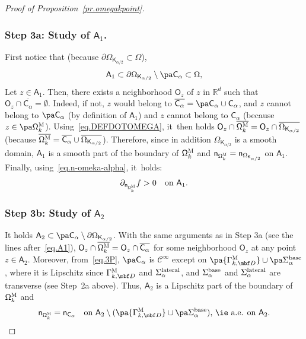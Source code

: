 \begin{proof}[Proof of Proposition~\ref{pr.omegakpoint}]
\subsubsection*{Step 3a: Study of $\mathsf A_1$. }
First notice that (because $\partial \Omega_{\mathsf K_{\alpha/2}}\subset \Omega$),
\begin{equation}\label{eq.A1}
\mathsf A_1\subset \partial \Omega_{\mathsf K_{\alpha/2}}\setminus \pa \mathsf C_\alpha \subset \Omega,
\end{equation}
Let $z\in\mathsf A_1$. Then, there exists a neighborhood $\mathsf O_z$ of $z$ in $\mathbb R^d$ such that $\mathsf O_z\cap \overline{\mathsf C_\alpha}=\emptyset$. Indeed, if not, $z$ would belong to $\overline{\mathsf C_\alpha}=\pa \mathsf C_{\alpha}\cup \mathsf C_{\alpha}$, and $z$ cannot belong to $\pa \mathsf C_{\alpha}$ (by definition of $\mathsf A_1$) and $z$ cannot belong to $ \mathsf C_{\alpha}$ (because $z\in \pa \mathsf \Omega_k^{\textsc{M}}$). Using~\eqref{eq.DEFDOTOMEGA}, it~then holds $\mathsf O_z\cap \overline{\mathsf \Omega_k^{\textsc{M}}}= \mathsf O_z \cap \overline{\Omega_{\mathsf K_{\alpha/2}}}$ (because $\overline{\mathsf \Omega_k^{\textsc{M}}}=\overline{\mathsf C_\alpha}\cup \overline{\Omega_{\mathsf K_{\alpha/2}}}$).
Therefore, since in addition $\Omega_{\mathsf K_{\alpha/2}}$ is a smooth domain, $\mathsf A_1$ is a smooth part of the boundary of $ \mathsf \Omega_k^{\textsc{M}}$ and $\mathsf n_{ \mathsf \Omega_k^{\textsc{M}}}=\mathsf n_{ \Omega_{\mathsf K_{\alpha/2}}}$ on $\mathsf A_1$.
Finally, using~\eqref{eq.n-omeka-alpha}, it~holds:
\begin{equation}\label{eq.panf1}
\partial_{ \mathsf n_{ \mathsf \Omega_k^{\textsc{M}}}} f>0 \quad\text{on }\mathsf A_1.
\end{equation}
\subsubsection*{Step 3b: Study of $\mathsf A_2$}
It holds $\mathsf A_2 \subset \pa \mathsf C_\alpha\setminus\partial \Omega_{\mathsf K_{\alpha/2}}$.
With the same arguments as in Step 3a (see the lines
after~\eqref{eq.A1}), $\mathsf O_z\cap \overline{\mathsf
\Omega_k^{\textsc{M}}}= \mathsf O_z \cap \overline{ \mathsf
C_\alpha}$ for some neighborhood $\mathsf O_z$ at any point $z \in \mathsf A_2$.
Moreover, from~\eqref{eq.3P}, $\pa \mathsf C_\alpha$ is
$\mathcal C^\infty$ except on $\pa{\Gamma_{k,\mbf D}^{\textsc{M}}
}\cup \pa \Sigma_\alpha^{\textup{base}}$, where it is Lipschitz since $\Gamma_{k,\mbf D}^{\textsc{M}}
$ and $\Sigma_\alpha^{\textup{lateral}}$, and $\Sigma_\alpha^{\textup{base}}$ and $\Sigma_\alpha^{\textup{lateral}}$ are transverse (see Step~2a above). Thus, $\mathsf A_2$ is a Lipschitz part of the boundary of $ \mathsf \Omega_k^{\textsc{M}}$ and
\begin{equation}\label{eq.nn=A2}
\mathsf n_{ \mathsf \Omega_k^{\textsc{M}}}=\mathsf n_{ \mathsf C_\alpha} \quad \text{on $\mathsf A_2\setminus (\pa{\Gamma_{k,\mbf D}^{\textsc{M}} }\cup \pa \Sigma_\alpha^{\textup{base}})$, \ie a.e. on $\mathsf A_2$}.
\end{equation}


\end{proof}

